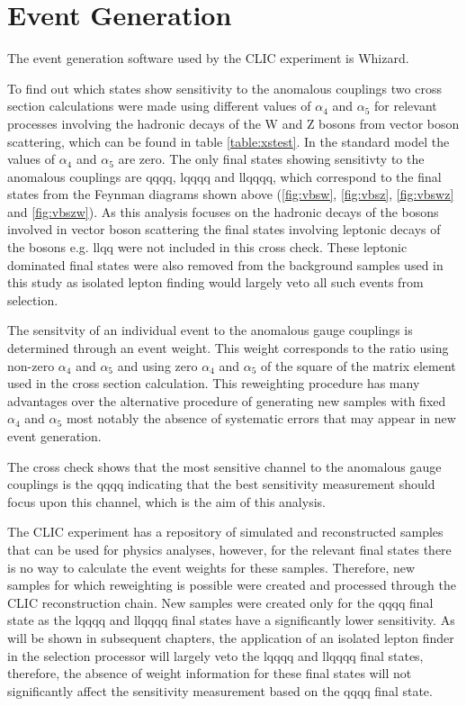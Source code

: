 \section{Event Generation}

The event generation software used by the CLIC experiment is Whizard. 

To find out which states show sensitivity to the anomalous couplings two cross section calculations were made using different values of $\alpha_{4}$ and $\alpha_{5}$ for relevant processes involving the hadronic decays of the W and Z bosons from vector boson scattering, which can be found in table \ref{table:xstest}.  In the standard model the values of $\alpha_{4}$ and $\alpha_{5}$ are zero.  The only final states showing sensitivty to the anomalous couplings are \nu{\nu}qqqq, l{\nu}qqqq and llqqqq, which correspond to the final states from the Feynman diagrams shown above (\ref{fig:vbsw}, \ref{fig:vbsz}, \ref{fig:vbswz} and \ref{fig:vbszw}).  As this analysis focuses on the hadronic decays of the bosons involved in vector boson scattering the final states involving leptonic decays of the bosons e.g. \nu{\nu}llqq were not included in this cross check.  These leptonic dominated final states were also removed from the background samples used in this study as isolated lepton finding would largely veto all such events from selection.

The sensitvity of an individual event to the anomalous gauge couplings is determined through an event weight.  This weight corresponds to the ratio using non-zero $\alpha_{4}$ and $\alpha_{5}$ and using zero $\alpha_{4}$ and $\alpha_{5}$ of the square of the matrix element used in the cross section calculation.  This reweighting procedure has many advantages over the alternative procedure of generating new samples with fixed $\alpha_{4}$ and $\alpha_{5}$ most notably the absence of systematic errors that may appear in new event generation.  

The cross check shows that the most sensitive channel to the anomalous gauge couplings is the \nu{\nu}qqqq indicating that the best sensitivity measurement should focus upon this channel, which is the aim of this analysis.  

The CLIC experiment has a repository of simulated and reconstructed samples that can be used for physics analyses, however, for the relevant final states there is no way to calculate the event weights for these samples.  Therefore, new samples for which reweighting is possible were created and processed through the CLIC reconstruction chain.  New samples were created only for the \nu \nu qqqq final state as the l{\nu}qqqq and llqqqq final states have a significantly lower sensitivity.  As will be shown in subsequent chapters, the application of an isolated lepton finder in the selection processor will largely veto the l{\nu}qqqq and llqqqq final states, therefore, the absence of weight information for these final states will not significantly affect the sensitivity measurement based on the \nu{\nu}qqqq final state.

